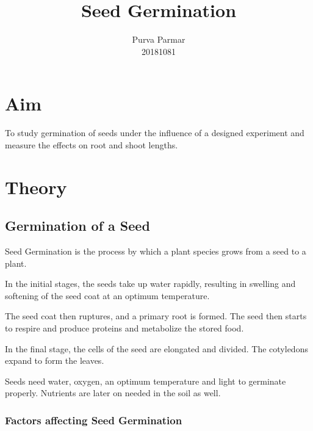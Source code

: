 \documentclass[twocolumn]{article}
\title{Seed Germination}
\author{Purva Parmar \\ 20181081}
\date{}
\begin{document}
\maketitle

\graphicspath{{../Images/}}

\setlength{\parindent}{0pt}
\setlength{\parskip}{\baselineskip}

\begin{strip}
\tableofcontents
\vspace{3em}
\end{strip}


\section{Aim}
To study germination of seeds under the influence of a designed experiment and measure the effects on root and shoot lengths.

\section{Theory}

\subsection{Germination of a Seed}

Seed Germination is the process by which a plant species grows from a seed to a plant. 

In the initial stages, the seeds take up water rapidly, resulting in swelling and softening of the seed coat at an optimum temperature. 

The seed coat then ruptures, and a primary root is formed. The seed then starts to respire and produce proteins and metabolize the stored food. 

In the final stage, the cells of the seed are elongated and divided. The cotyledons expand to form the leaves. 

Seeds need water, oxygen, an optimum temperature and light to germinate properly. Nutrients are later on needed in the soil as well.

\subsubsection{Factors affecting Seed Germination}
\end{document}
